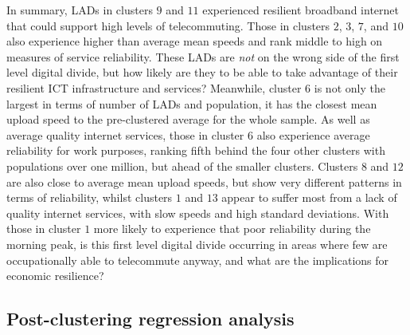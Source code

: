 \documentclass[Royal,times,sageh]{sagej}
\begin{document}
In summary, LADs in clusters \(9\) and \(11\) experienced resilient
broadband internet that could support high levels of telecommuting.
Those in clusters \(2\), \(3\), \(7\), and \(10\) also experience higher
than average mean speeds and rank middle to high on measures of service
reliability. These LADs are \emph{not} on the wrong side of the first
level digital divide, but how likely are they to be able to take
advantage of their resilient ICT infrastructure and services? Meanwhile,
cluster \(6\) is not only the largest in terms of number of LADs and
population, it has the closest mean upload speed to the pre-clustered
average for the whole sample. As well as average quality internet
services, those in cluster \(6\) also experience average reliability for
work purposes, ranking fifth behind the four other clusters with
populations over one million, but ahead of the smaller clusters.
Clusters \(8\) and \(12\) are also close to average mean upload speeds,
but show very different patterns in terms of reliability, whilst
clusters \(1\) and \(13\) appear to suffer most from a lack of quality
internet services, with slow speeds and high standard deviations. With
those in cluster \(1\) more likely to experience that poor reliability
during the morning peak, is this first level digital divide occurring in
areas where few are occupationally able to telecommute anyway, and what
are the implications for economic resilience?

\hypertarget{sec:4.2}{%
\subsection{Post-clustering regression analysis}\label{sec:4.2}}
\end{document}
